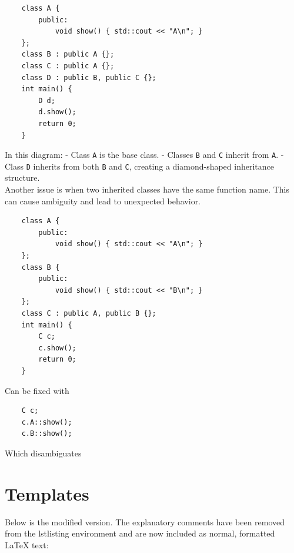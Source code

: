 \documentclass{report}
\begin{document}
\begin{lstlisting}
	class A {
		public:
			void show() { std::cout << "A\n"; }
	};
	class B : public A {};
	class C : public A {};
	class D : public B, public C {};
	int main() {
		D d;
		d.show();
		return 0;
	}
\end{lstlisting}


In this diagram:
- Class \texttt{A} is the base class.
- Classes \texttt{B} and \texttt{C} inherit from \texttt{A}.
- Class \texttt{D} inherits from both \texttt{B} and \texttt{C}, creating a diamond-shaped inheritance structure.\\

Another issue is when two inherited classes have the same function name. This can cause ambiguity and lead to unexpected behavior.

\begin{lstlisting}
	class A {
		public:
			void show() { std::cout << "A\n"; }
	};
	class B {
		public:
			void show() { std::cout << "B\n"; }
	};
	class C : public A, public B {};
	int main() {
		C c;
		c.show();
		return 0;
	}
\end{lstlisting}

Can be fixed with

\begin{lstlisting}
	C c;
	c.A::show();
	c.B::show();
\end{lstlisting}

Which disambiguates

\section{Templates}

Below is the modified version. The explanatory comments have been removed from the lstlisting environment and are now included as normal, formatted LaTeX text:
\end{document}
